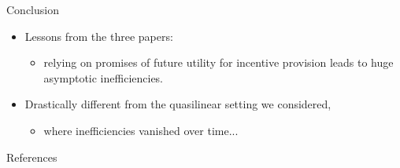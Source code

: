 \documentclass[english,10pt
,aspectratio=169
]{beamer}
\begin{document}
\begin{frame}{Conclusion}
\begin{itemize}
	\item Lessons from the three papers:
	\begin{itemize}
		\item relying on promises of future utility for incentive provision leads to huge asymptotic inefficiencies.
	\end{itemize}
	\item Drastically different from the quasilinear setting we considered,
	\begin{itemize}
		\item where inefficiencies vanished over time...
	\end{itemize}
\end{itemize}
\end{frame}


\appendix
\begin{frame}[allowframebreaks]{References}


\end{frame}
\end{document}
